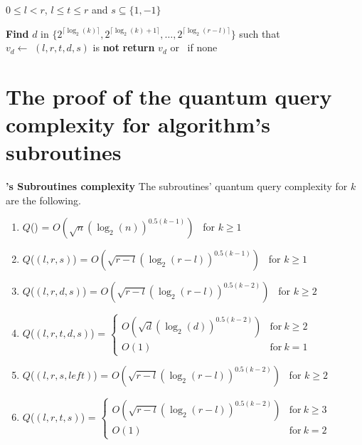 \begin{appendix}
    \begin{algorithm}[h!]
        \caption{$\FFP{k}(l,r,t,s)$}\label{alg:ffp}
        \begin{algorithmic}
            \Require $0\leq l<r$, $l \leq t \leq r$ and $s \subseteq \{1, -1\}$

            \State \textbf{Find} $d$ in $\{2^{\lceil \log_2(k)\rceil }, 2^{\lceil \log_2(k)+1\rceil },\ldots,2^{\lceil \log_2(r-l)\rceil }\}$
            such that \\
            \hspace*{1cm} $v_d \gets $ $(l,r,t,d,s)$ is \textbf{not} \Null
            \State \textbf{return} $v_d$ or \Null \ if none
        \end{algorithmic}
    \end{algorithm}

    \newpage

    \section{The proof of the quantum query complexity for  algorithm's subroutines}
    \label{proof:complexity_dyckkn}

    \begin{theorem}{\textbf{'s Subroutines complexity}}
        The subroutines' quantum query complexity for $k$ are the following.
        \begin{enumerate}
            \item $Q$() = $O\left(\sqrt{n}(\log_2(n))^{0.5(k-1)}\right)$ \ for $k \geq 1$
            \item $Q$($(l,r,s)$) = $O\left(\sqrt{r-l}(\log_2(r-l))^{0.5(k-1)}\right)$ \ for $k \geq 1$
            \item $Q$($(l,r,d,s)$) = $O\left(\sqrt{r-l}(\log_2(r-l))^{0.5(k-2)}\right)$ \ for $k \geq 2$
            \item $Q$($(l, r, t, d, s)$) = $\left\{
                      \begin{array}{ll}
                          O\left(\sqrt{d}(\log_2(d))^{0.5(k-2)}\right) & \textrm{for} \ k \geq 2 \\
                          O(1)                                         & \textrm{for} \  k = 1
                      \end{array}
                      \right.$
            \item $Q$($(l,r,s, left)$) = $O\left(\sqrt{r-l}(\log_2(r-l))^{0.5(k-2)}\right)$ \ for $k \geq 2$
            \item $Q$($(l,r,t,s)$) = $\left\{ \begin{array}{ll}
                          O\left(\sqrt{r-l}(\log_2(r-l))^{0.5(k-2)}\right) & \textrm{for} \ k \geq 3 \\
                          O(1)                                             & \textrm{for} \ k = 2
                      \end{array}
                      \right.$
        \end{enumerate}
    \end{theorem}


\end{appendix}
